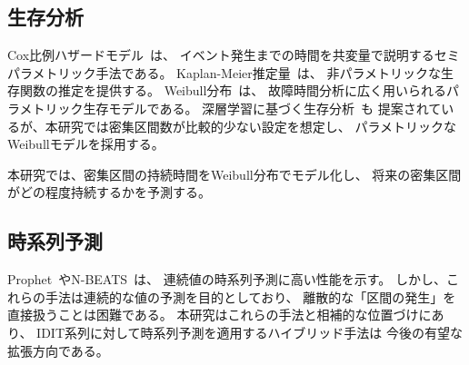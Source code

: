 \subsection{生存分析}

Cox比例ハザードモデル~\cite{cox1972regression}は、
イベント発生までの時間を共変量で説明するセミパラメトリック手法である。
Kaplan-Meier推定量~\cite{kaplan1958nonparametric}は、
非パラメトリックな生存関数の推定を提供する。
Weibull分布~\cite{weibull1951statistical}は、
故障時間分析に広く用いられるパラメトリック生存モデルである。
深層学習に基づく生存分析~\cite{katzman2018deepsurv}も
提案されているが、本研究では密集区間数が比較的少ない設定を想定し、
パラメトリックなWeibullモデルを採用する。

本研究では、密集区間の持続時間をWeibull分布でモデル化し、
将来の密集区間がどの程度持続するかを予測する。

\subsection{時系列予測}

Prophet~\cite{taylor2018forecasting}やN-BEATS~\cite{oreshkin2020nbeats}は、
連続値の時系列予測に高い性能を示す。
しかし、これらの手法は連続的な値の予測を目的としており、
離散的な「区間の発生」を直接扱うことは困難である。
本研究はこれらの手法と相補的な位置づけにあり、
IDIT系列に対して時系列予測を適用するハイブリッド手法は
今後の有望な拡張方向である。
